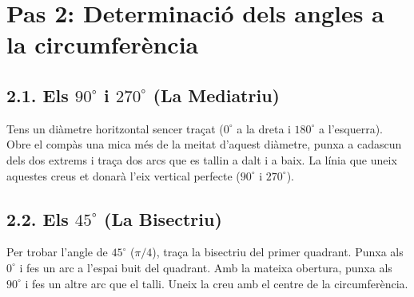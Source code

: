 \documentclass[12pt,a4paper]{article}
\begin{document}
\newpage
\section*{Pas 2: Determinació dels angles a la circumferència}

\subsection*{2.1. Els $90^\circ$ i $270^\circ$ (La Mediatriu)}
Tens un diàmetre horitzontal sencer traçat ($0^\circ$ a la dreta i $180^\circ$ a l'esquerra). Obre el compàs una mica més de la meitat d'aquest diàmetre, punxa a cadascun dels dos extrems i traça dos arcs que es tallin a dalt i a baix. La línia que uneix aquestes creus et donarà l'eix vertical perfecte ($90^\circ$ i $270^\circ$).

\begin{center}
\end{center}

\subsection*{2.2. Els $45^\circ$ (La Bisectriu)}
Per trobar l'angle de $45^\circ$ ($\pi/4$), traça la bisectriu del primer quadrant. Punxa als $0^\circ$ i fes un arc a l'espai buit del quadrant. Amb la mateixa obertura, punxa als $90^\circ$ i fes un altre arc que el talli. Uneix la creu amb el centre de la circumferència.
\end{document}
